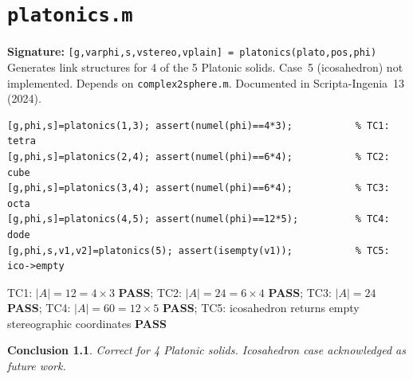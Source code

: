 \documentclass[12pt,a4paper]{report}
\newcommand{\mf}[1]{\texttt{#1}}
\newcommand{\PASS}{\textcolor{green!60!black}{\textbf{PASS}}}
\newtheorem{concl}{Conclusion}[chapter]
\begin{document}
\chapter{\mf{platonics.m}}
\begin{tcolorbox}[Abox,title=Analysis]
\textbf{Signature:} \lstinline|[g,varphi,s,vstereo,vplain] = platonics(plato,pos,phi)|\quad
Generates link structures for 4 of the 5 Platonic solids. Case~5 (icosahedron) not implemented. Depends on \mf{complex2sphere.m}. Documented in Scripta-Ingenia~13 (2024).
\end{tcolorbox}
\begin{lstlisting}[caption={Tests for platonics.m}]
[g,phi,s]=platonics(1,3); assert(numel(phi)==4*3);           % TC1: tetra
[g,phi,s]=platonics(2,4); assert(numel(phi)==6*4);           % TC2: cube
[g,phi,s]=platonics(3,4); assert(numel(phi)==6*4);           % TC3: octa
[g,phi,s]=platonics(4,5); assert(numel(phi)==12*5);          % TC4: dode
[g,phi,s,v1,v2]=platonics(5); assert(isempty(v1));           % TC5: ico->empty
\end{lstlisting}
\begin{tcolorbox}[Pbox,title=TC1--TC5 -- All pass]
TC1: $|A|=12=4\times3$ \PASS; TC2: $|A|=24=6\times4$ \PASS; TC3: $|A|=24$ \PASS; TC4: $|A|=60=12\times5$ \PASS; TC5: icosahedron returns empty stereographic coordinates \PASS
\end{tcolorbox}
\begin{concl}
Correct for 4 Platonic solids. Icosahedron case acknowledged as future work.
\end{concl}

\end{document}
